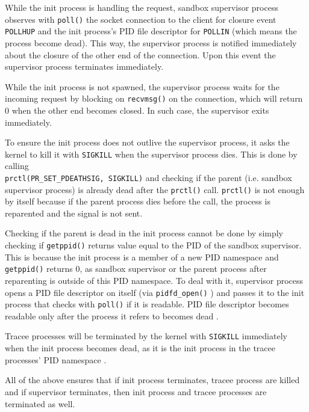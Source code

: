 \documentclass[en]{pracamgr}
\begin{document}
While the init process is handling the request, sandbox supervisor process observes with \texttt{poll()} \cite{man_poll} the socket connection to the client for closure event \texttt{POLLHUP} and the init process's PID file descriptor for \texttt{POLLIN} (which means the process become dead). This way, the supervisor process is notified immediately about the closure of the other end of the connection. Upon this event the supervisor process terminates immediately.

While the init process is not spawned, the supervisor process waits for the incoming request by blocking on \texttt{recvmsg()} \cite{man_recvmsg} on the connection, which will return 0 when the other end becomes closed. In such case, the supervisor exits immediately.

To ensure the init process does not outlive the supervisor process, it asks the kernel to kill it with \texttt{SIGKILL} when the supervisor process dies. This is done by calling \\\texttt{prctl(PR\_SET\_PDEATHSIG, SIGKILL)} \cite{man_prctl} and checking if the parent (i.e. sandbox supervisor process) is already dead after the \texttt{prctl()} call. \texttt{prctl()} is not enough by itself because if the parent process dies before the call, the process is reparented and the signal is not sent.

Checking if the parent is dead in the init process cannot be done by simply checking if \texttt{getppid()} \cite{man_getppid} returns value equal to the PID of the sandbox supervisor. This is because the init process is a member of a new PID namespace and \texttt{getppid()} returns 0, as sandbox supervisor or the parent process after reparenting is outside of this PID namespace. To deal with it, supervisor process opens a PID file descriptor on itself (via \texttt{pidfd\_open()} \cite{man_pidfd_open}) and passes it to the init process that checks with \texttt{poll()} \cite{man_poll} if it is readable. PID file descriptor becomes readable only after the process it refers to becomes dead \cite{man_pidfd_open}.

Tracee processes will be terminated by the kernel with \texttt{SIGKILL} immediately when the init process becomes dead, as it is the init process in the tracee processes' PID namespace \cite{man_pid_namespaces}.

All of the above ensures that if init process terminates, tracee process are killed and if supervisor terminates, then init process and tracee processes are terminated as well.
\end{document}
